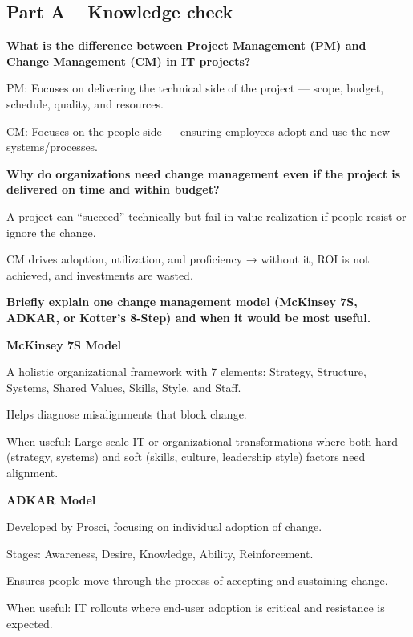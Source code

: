 \subsection{Part A – Knowledge check}

\indent 

\noindent\textbf{What is the difference between Project Management (PM) and Change Management (CM) in IT projects?}


PM: Focuses on delivering the technical side of the project — scope, budget, schedule, quality, and resources.

CM: Focuses on the people side — ensuring employees adopt and use the new systems/processes.


\bigskip

\noindent\textbf{Why do organizations need change management even if the project is delivered on time and within budget?}



A project can “succeed” technically but fail in value realization if people resist or ignore the change.

CM drives adoption, utilization, and proficiency → without it, ROI is not achieved, and investments are wasted.


\bigskip

\noindent\textbf{Briefly explain one change management model (McKinsey 7S, ADKAR, or Kotter’s 8-Step) and when it would be most useful.}



\noindent\textbf{McKinsey 7S Model}

A holistic organizational framework with 7 elements: Strategy, Structure, Systems, Shared Values, Skills, Style, and Staff.

Helps diagnose misalignments that block change.

When useful: Large-scale IT or organizational transformations where both hard (strategy, systems) and soft (skills, culture, leadership style) factors need alignment.

\bigskip

\noindent\textbf{ADKAR Model}

Developed by Prosci, focusing on individual adoption of change. 

Stages: Awareness, Desire, Knowledge, Ability, Reinforcement.

Ensures people move through the process of accepting and sustaining change.

When useful: IT rollouts where end-user adoption is critical and resistance is expected.

